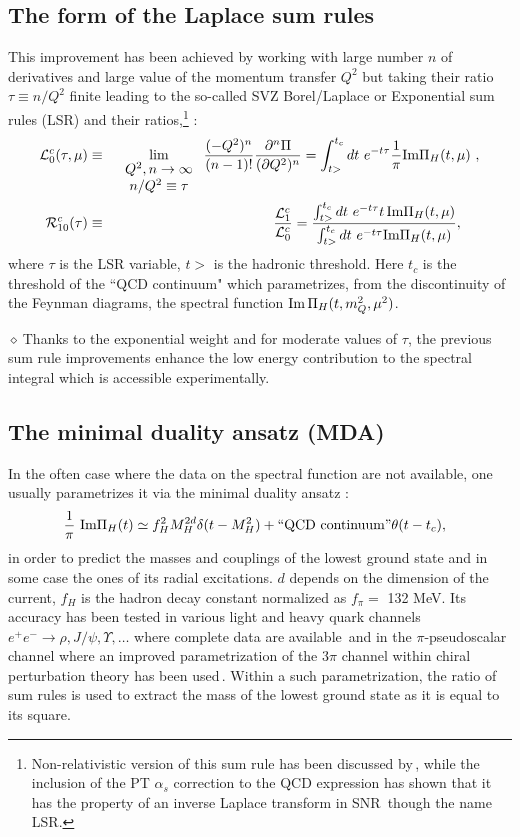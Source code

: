 \documentclass[aps,prd,groupedaddress,nofootinbib]{revtex4-1}
\def\bea{\begin{eqnarray}}
\def\eea{\end{eqnarray}}
\def\nnb{\nonumber}
\def\nnb{\nonumber}
\def\d{$\diamond~$}
\begin{document}
\subsection{The form of the Laplace sum rules}
This improvement has been achieved by working with large number $n$ of derivatives and large value of the momentum transfer $Q^2$ but taking their ratio $\tau\equiv n/Q^2$ finite leading to the so-called SVZ Borel/Laplace or Exponential sum rules (LSR) and their ratios,\footnote{Non-relativistic version of this sum  rule has been discussed by\,\cite{BELLa,BERTa}, while the inclusion of the PT $\alpha_s$ correction to the QCD expression has shown that it has the property of an inverse Laplace transform in SNR\,\cite{SNR} though the name LSR.} :
\bea
{\cal L}_0^c(\tau,\mu)&\equiv&\lim_ {\begin{tabular}{c}
$Q^2,n\to\infty$ \\ $n/Q^2\equiv\tau$
\end{tabular}}
\frac{(-Q^2)^n}{(n-1)!}\frac{\partial^n \Pi}{ ( \partial Q^2)^n}
=\int_{t>}^{t_c}dt~e^{-t\tau}\frac{1}{\pi} \mbox{Im}\Pi_H(t,\mu)~,
\nnb\\
 {\cal R}^c_{10}(\tau)&\equiv&\frac{{\cal L}^c_{1}} {{\cal L}^c_0}= \frac{\int_{t>}^{t_c}dt~e^{-t\tau}t\, \mbox{Im}\Pi_H(t,\mu)}{\int_{t>}^{t_c}dt~e^{-t\tau} \mbox{Im}\Pi_H(t,\mu)},~~~~
\label{eq:lsr}
\eea
where $\tau$ is the LSR variable, $t>$   is the hadronic threshold.  Here $t_c$ is  the threshold of the ``QCD continuum" which parametrizes, from the discontinuity of the Feynman diagrams, the spectral function  ${\rm Im}\,\Pi_H(t,m_Q^2,\mu^2)$.  

\d Thanks to the exponential weight and for moderate values of $\tau$, the previous sum rule improvements enhance the low energy contribution to the spectral integral which is accessible experimentally. 

\subsection{The minimal duality ansatz (MDA)} 
In the often case where the data
on the spectral function are not available, one usually parametrizes it via the minimal duality ansatz :
\vspace*{-0.2cm}
\bea
\hspace*{-0.25cm}
\frac{1}{\pi}\mbox{ Im}\Pi_H(t)\simeq  f^2_HM_H^{2d}\delta(t-M^2_H)
  +
  ``\mbox{QCD continuum}" \theta (t-t_c),
\label{eq:duality}
\eea
 in order to predict the masses and couplings of the lowest ground state and in some case the ones of its radial excitations.  $d$ depends on the dimension of the current, $f_H$ is the hadron decay constant  normalized as $f_\pi=$ 132 MeV. Its accuracy has been tested in various light and heavy quark channels $e^+e^-\to \rho,J/\psi, \Upsilon,\dots$ where complete data are available\,\cite{SNB1,SNB2} and in the $\pi$-pseudoscalar channel where an improved parametrization of the $3\pi$ channel within chiral perturbation theory has been used\,\cite{BIJNENS}. Within a such parametrization, the ratio of sum rules is used to extract the mass of the lowest ground state as it is equal to its square. 
\end{document}
